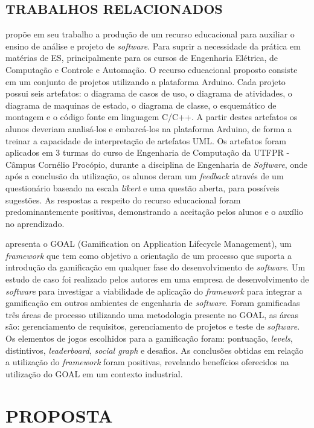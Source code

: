 \section{TRABALHOS RELACIONADOS}
\label{sec:trabalhos-relacionados}
\cite{utfpr2017} propõe em seu trabalho a produção de um recurso educacional para auxiliar o ensino de análise e projeto de \textit{software}. Para suprir a necessidade da prática em matérias de ES, principalmente para os cursos de Engenharia Elétrica, de Computação e Controle e Automação. O recurso educacional proposto consiste em um conjunto de projetos utilizando a plataforma Arduino. Cada projeto possui seis artefatos: o diagrama de casos de uso, o diagrama de atividades, o diagrama de maquinas de estado, o diagrama de classe, o esquemático de montagem e o código fonte em linguagem C/C++. A partir destes artefatos os alunos deveriam analisá-los e embarcá-los na plataforma Arduino, de forma a treinar a capacidade de interpretação de artefatos UML. Os artefatos foram aplicados em 3 turmas do curso de Engenharia de Computação da UTFPR - Câmpus Cornélio Procópio, durante a disciplina de Engenharia de \textit{Software}, onde após a conclusão da utilização, os alunos deram um \textit{feedback} através de um questionário baseado na escala \textit{likert} e uma questão aberta, para possíveis sugestões. As respostas a respeito do recurso educacional foram predominantemente positivas, demonstrando a aceitação pelos alunos e o auxílio no aprendizado.

\cite{Garcia2017} apresenta o GOAL (Gamification on Application Lifecycle Management), um \textit{framework} que tem como objetivo a orientação de um processo que suporta a introdução da gamificação em qualquer fase do desenvolvimento de \textit{software}. Um estudo de caso foi realizado pelos autores em uma empresa de desenvolvimento de \textit{software} para investigar a viabilidade de aplicação do \textit{framework} para integrar a gamificação em outros ambientes de engenharia de \textit{software}. Foram gamificadas três áreas de processo utilizando uma metodologia presente no GOAL, as áreas são: gerenciamento de requisitos, gerenciamento de projetos e teste de \textit{software}. Os elementos de jogos escolhidos para a gamificação foram: pontuação, \textit{levels}, distintivos, \textit{leaderboard}, \textit{social graph} e desafios. As conclusões obtidas em relação a utilização do \textit{framework} foram positivas, revelando benefícios oferecidos na utilização do GOAL em um contexto industrial. 

\chapter{PROPOSTA}
\label{chap:proposta}

